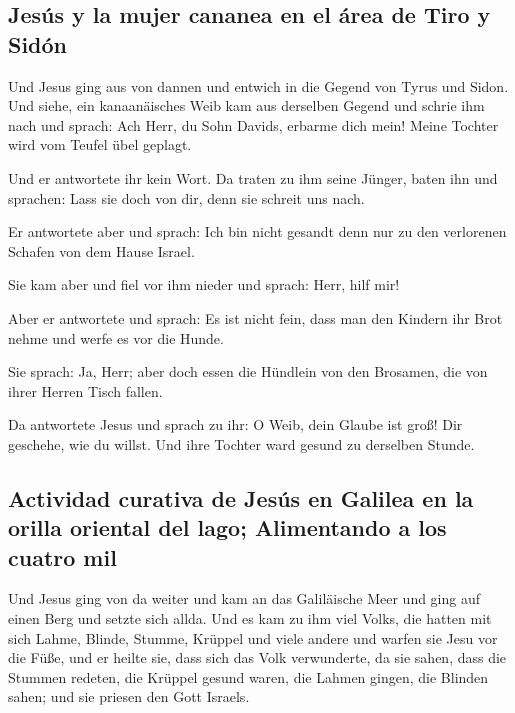 \hypertarget{jesuxfas-y-la-mujer-cananea-en-el-uxe1rea-de-tiro-y-siduxf3n}{%
\subsection{Jesús y la mujer cananea en el área de Tiro y
Sidón}\label{jesuxfas-y-la-mujer-cananea-en-el-uxe1rea-de-tiro-y-siduxf3n}}

 Und Jesus ging aus von dannen und entwich in die Gegend
von Tyrus und Sidon.  Und siehe, ein kanaanäisches Weib
kam aus derselben Gegend und schrie ihm nach und sprach: Ach Herr, du
Sohn Davids, erbarme dich mein! Meine Tochter wird vom Teufel übel
geplagt.

 Und er antwortete ihr kein Wort. Da traten zu ihm seine
Jünger, baten ihn und sprachen: Lass sie doch von dir, denn sie schreit
uns nach.

 Er antwortete aber und sprach: Ich bin nicht gesandt
denn nur zu den verlorenen Schafen von dem Hause Israel.

 Sie kam aber und fiel vor ihm nieder und sprach: Herr,
hilf mir!

 Aber er antwortete und sprach: Es ist nicht fein, dass
man den Kindern ihr Brot nehme und werfe es vor die Hunde.

 Sie sprach: Ja, Herr; aber doch essen die Hündlein von
den Brosamen, die von ihrer Herren Tisch fallen.

 Da antwortete Jesus und sprach zu ihr: O Weib, dein
Glaube ist groß! Dir geschehe, wie du willst. Und ihre Tochter ward
gesund zu derselben Stunde.

\hypertarget{actividad-curativa-de-jesuxfas-en-galilea-en-la-orilla-oriental-del-lago-alimentando-a-los-cuatro-mil}{%
\subsection{Actividad curativa de Jesús en Galilea en la orilla oriental
del lago; Alimentando a los cuatro
mil}\label{actividad-curativa-de-jesuxfas-en-galilea-en-la-orilla-oriental-del-lago-alimentando-a-los-cuatro-mil}}

 Und Jesus ging von da weiter und kam an das Galiläische
Meer und ging auf einen Berg und setzte sich allda.  Und
es kam zu ihm viel Volks, die hatten mit sich Lahme, Blinde, Stumme,
Krüppel und viele andere und warfen sie Jesu vor die Füße, und er heilte
sie,  dass sich das Volk verwunderte, da sie sahen, dass
die Stummen redeten, die Krüppel gesund waren, die Lahmen gingen, die
Blinden sahen; und sie priesen den Gott Israels.

